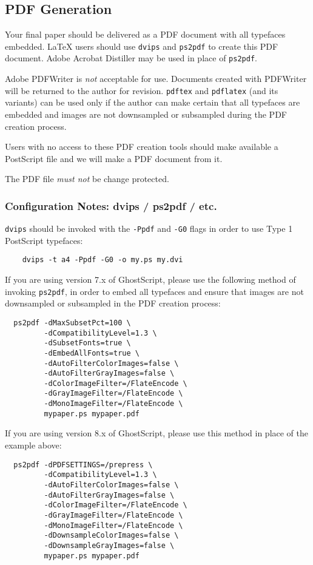 \subsection{PDF Generation}

Your final paper should be delivered as a PDF document with all typefaces
embedded. \LaTeX{} users should use \texttt{dvips} and \texttt{ps2pdf} to
create this PDF document. Adobe Acrobat Distiller may be used in place of
\texttt{ps2pdf}.

Adobe PDFWriter is \emph{not} acceptable for use. Documents created with
PDFWriter will be returned to the author for revision. \texttt{pdftex} and
\texttt{pdflatex} (and its variants) can be used only if the author can
make certain that all typefaces are embedded and images are not downsampled
or subsampled during the PDF creation process.

Users with no access to these PDF creation tools should make available a
PostScript file and we will make a PDF document from it.


The PDF file \emph{must not} be change protected.

\subsubsection*{Configuration Notes: dvips / ps2pdf / etc.}

\noindent
\texttt{dvips} should be invoked with the \texttt{-Ppdf} and \texttt{-G0}
flags in order to use Type 1 PostScript typefaces:

\begin{verbatim}
    dvips -t a4 -Ppdf -G0 -o my.ps my.dvi
\end{verbatim}


\noindent
If you are using version 7.x of GhostScript, please use the following method of invoking \texttt{ps2pdf}, in
order to embed all typefaces and ensure that images are not downsampled or subsampled in the PDF
creation process:

\begin{verbatim}
  ps2pdf -dMaxSubsetPct=100 \
         -dCompatibilityLevel=1.3 \
         -dSubsetFonts=true \
         -dEmbedAllFonts=true \
         -dAutoFilterColorImages=false \
         -dAutoFilterGrayImages=false \
         -dColorImageFilter=/FlateEncode \
         -dGrayImageFilter=/FlateEncode \
         -dMonoImageFilter=/FlateEncode \
         mypaper.ps mypaper.pdf
\end{verbatim}


If you are using version 8.x of GhostScript, please use this method in place of the example above:
\begin{verbatim}
  ps2pdf -dPDFSETTINGS=/prepress \
         -dCompatibilityLevel=1.3 \
         -dAutoFilterColorImages=false \
         -dAutoFilterGrayImages=false \
         -dColorImageFilter=/FlateEncode \
         -dGrayImageFilter=/FlateEncode \
         -dMonoImageFilter=/FlateEncode \
         -dDownsampleColorImages=false \
         -dDownsampleGrayImages=false \
         mypaper.ps mypaper.pdf
\end{verbatim}

